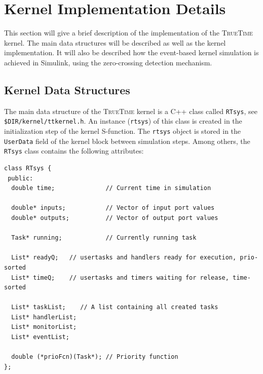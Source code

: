 \documentclass[final,twoside]{rapport}
\begin{document}



\section{Kernel Implementation Details}

This section will give a brief description of the implementation of
the \textsc{TrueTime} kernel. The main data structures will be
described as well as the kernel implementation. It will also be
described how the event-based kernel simulation is achieved in
Simulink, using the zero-crossing detection mechanism.

\subsection{Kernel Data Structures}

The main data structure of the \textsc{TrueTime} kernel is a C++ class
called \texttt{RTsys}, see \texttt{\$DIR/kernel/ttkernel.h}. An
instance (\texttt{rtsys}) of this class is created in the
initialization step of the kernel S-function. The \texttt{rtsys}
object is stored in the \texttt{UserData} field of the kernel block
between simulation steps. Among others, the \texttt{RTsys} class
contains the following attributes:

\begin{small}
\begin{verbatim}
class RTsys {
 public:
  double time;              // Current time in simulation
  
  double* inputs;           // Vector of input port values
  double* outputs;          // Vector of output port values

  Task* running;            // Currently running task

  List* readyQ;   // usertasks and handlers ready for execution, prio-sorted
  List* timeQ;    // usertasks and timers waiting for release, time-sorted

  List* taskList;    // A list containing all created tasks
  List* handlerList;
  List* monitorList;
  List* eventList;
  
  double (*prioFcn)(Task*); // Priority function
};
\end{verbatim}
\end{small}
\end{document}
